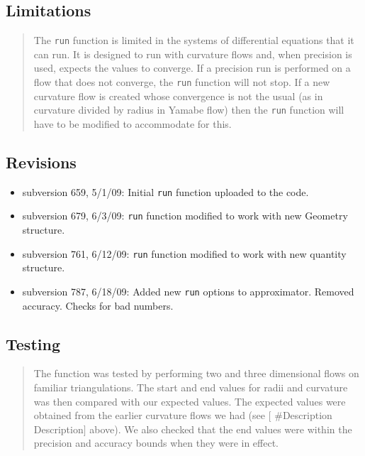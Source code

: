 \subsection*{Limitations}

\begin{quotation}
The \texttt{run} function is limited in the systems of differential
equations that it can run. It is designed to run with curvature flows and,
when precision is used, expects the values to converge. If a precision run
is performed on a flow that does not converge, the \texttt{run} function
will not stop. If a new curvature flow is created whose convergence is not
the usual (as in curvature divided by radius in Yamabe flow) then the 
\texttt{run} function will have to be modified to accommodate for this.
\end{quotation}

\subsection*{Revisions}

\begin{itemize}
\item subversion 659, 5/1/09: Initial \texttt{run} function uploaded to the
code.

\item subversion 679, 6/3/09: \texttt{run} function modified to work with
new Geometry structure.

\item subversion 761, 6/12/09: \texttt{run} function modified to work with
new quantity structure.

\item subversion 787, 6/18/09: Added new \texttt{run} options to
approximator. Removed accuracy. Checks for bad numbers.
\end{itemize}

\subsection*{Testing}

\begin{quotation}
The function was tested by performing two and three dimensional flows on
familiar triangulations. The start and end values for radii and curvature
was then compared with our expected values. The expected values were
obtained from the earlier curvature flows we had (see \mbox{$[$}%
\#Description Description\mbox{$]$} above). We also checked that the end
values were within the precision and accuracy bounds when they were in
effect.
\end{quotation}

